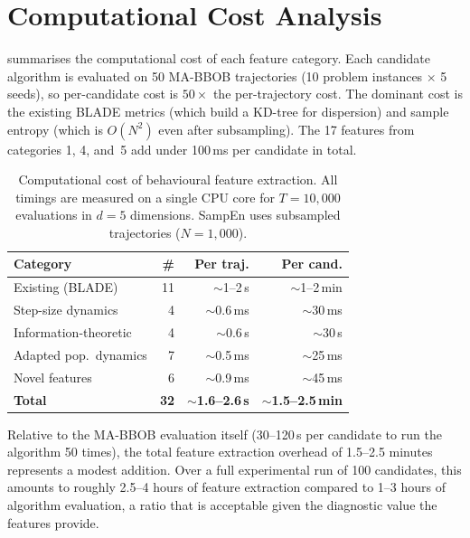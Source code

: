 \section{Computational Cost Analysis}
\label{sec:features:cost}

 summarises the computational cost of each feature
category.  Each candidate algorithm is evaluated on 50 MA-BBOB trajectories
(10 problem instances $\times$ 5 seeds), so per-candidate cost is $50\times$
the per-trajectory cost. The dominant cost is the existing BLADE metrics (which build a KD-tree for
dispersion) and sample entropy (which is $O(N^2)$ even after subsampling).
The 17 features from categories 1, 4, and~5 add under 100\,ms per candidate in
total.

\begin{table}[t]
  \centering
  \caption{Computational cost of behavioural feature extraction.  All timings
    are measured on a single CPU core for $T = 10{,}000$ evaluations in $d = 5$
    dimensions.  SampEn uses subsampled trajectories ($N = 1{,}000$).}
  \label{tab:feature_cost}
  \footnotesize
  \begin{tabular}{@{}lrrr@{}}
    \toprule
    Category & \# & Per traj. & Per cand. \\
    \midrule
    Existing (BLADE)            & 11 & $\sim$1--2\,s   & $\sim$1--2\,min \\
    Step-size dynamics          &  4 & $\sim$0.6\,ms   & $\sim$30\,ms    \\
    Information-theoretic       &  4 & $\sim$0.6\,s    & $\sim$30\,s     \\
    Adapted pop.\ dynamics      &  7 & $\sim$0.5\,ms   & $\sim$25\,ms    \\
    Novel features              &  6 & $\sim$0.9\,ms   & $\sim$45\,ms    \\
    \midrule
    \textbf{Total}              & \textbf{32} & $\sim$\textbf{1.6--2.6\,s} & $\sim$\textbf{1.5--2.5\,min} \\
    \bottomrule
  \end{tabular}
\end{table}

Relative to the MA-BBOB evaluation itself (30--120\,s per candidate to run
the algorithm 50 times), the total feature extraction overhead of 1.5--2.5
minutes represents a modest addition.  Over a full experimental run of 100
candidates, this amounts to roughly 2.5--4 hours of feature extraction
compared to 1--3 hours of algorithm evaluation, a ratio that is acceptable
given the diagnostic value the features provide.
